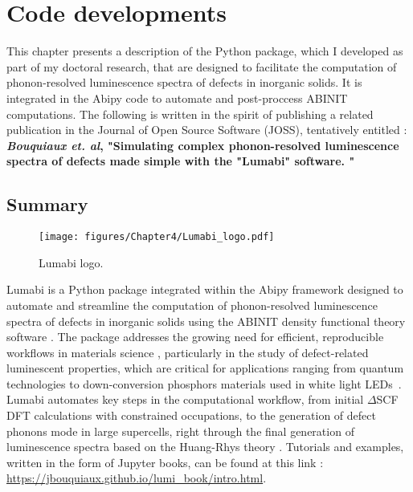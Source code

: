 
\chapter{Code developments}
\label{chap:chap4}

This chapter presents a description of the Python package, which I developed as part of my doctoral research, that are designed to facilitate the computation of phonon-resolved luminescence spectra of defects in inorganic solids. It is integrated in the Abipy code to automate and post-proccess ABINIT computations. The following is written in the spirit of publishing a related publication in the Journal of Open Source Software (JOSS), tentatively entitled :  \textbf{\textit{Bouquiaux et. al}, "Simulating complex phonon-resolved luminescence spectra of defects made simple with the "Lumabi" software. "}

\section{Summary}

\begin{wrapfigure}{r}{0.4\textwidth} %
	\centering
	\texttt{[image: figures/Chapter4/Lumabi\_logo.pdf]}
	\caption{Lumabi logo.} 
	\label{fig:Lumabi}
\end{wrapfigure}

Lumabi is a Python package integrated within the Abipy framework \cite{gonze2020abinit} designed to automate and streamline the computation of phonon-resolved luminescence spectra of defects in inorganic solids using the ABINIT density functional theory software \cite{gonze2002first, gonze2009abinit, gonze2016recent, gonze2020abinit}. The package addresses the growing need for efficient, reproducible workflows in materials science \cite{lejaeghere2016reproducibility, bosoni2024verify}, particularly in the study of defect-related luminescent properties, which are critical for applications ranging from quantum technologies \cite{wolfowicz2021quantum, dreyer2018first} to down-conversion phosphors materials used in white light LEDs~\cite{pust2015revolution, lin2017inorganic, fang2022evolutionary}. Lumabi automates key steps in the computational workflow, from initial $\Delta$SCF DFT calculations with constrained occupations, to the generation of defect phonons mode in large supercells, right through the final generation of luminescence spectra based on the Huang-Rhys theory \cite{huang1950theory,jin2021photoluminescence}. Tutorials and examples, written in the form of Jupyter books, can be found at this link : \url{https://jbouquiaux.github.io/lumi_book/intro.html}.


